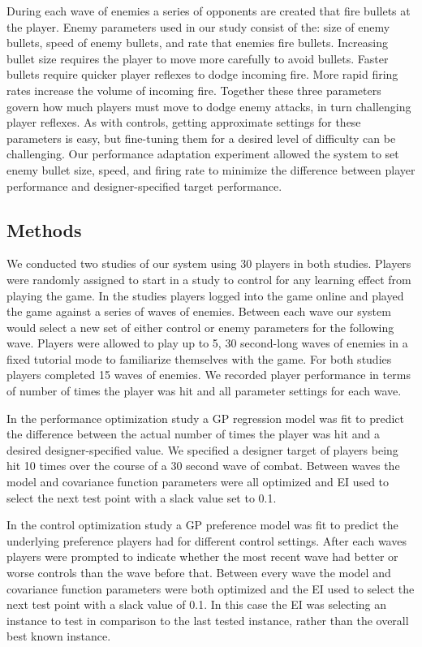 \documentclass[letterpaper]{article}
\begin{document}
During each wave of enemies a series of opponents are created that fire bullets at the player. Enemy parameters used in our study consist of the: size of enemy bullets, speed of enemy bullets, and rate that enemies fire bullets. Increasing bullet size requires the player to move more carefully to avoid bullets. Faster bullets require quicker player reflexes to dodge incoming fire. More rapid firing rates increase the volume of incoming fire. Together these three parameters govern how much players must move to dodge enemy attacks, in turn challenging player reflexes. As with controls, getting approximate settings for these parameters is easy, but fine-tuning them for a desired level of difficulty can be challenging. Our performance adaptation experiment allowed the system to set enemy bullet size, speed, and firing rate to minimize the difference between player performance and designer-specified target performance.


\subsection{Methods}
We conducted two studies of our system using 30 players in both studies. Players were randomly assigned to start in a study to control for any learning effect from playing the game. In the studies players logged into the game online and played the game against a series of waves of enemies. Between each wave our system would select a new set of either control or enemy parameters for the following wave. Players were allowed to play up to 5, 30 second-long waves of enemies in a fixed tutorial mode to familiarize themselves with the game. For both studies players completed 15 waves of enemies. We recorded player performance in terms of number of times the player was hit and all parameter settings for each wave.

In the performance optimization study a GP regression model was fit to predict the difference between the actual number of times the player was hit and a desired designer-specified value. We specified a designer target of players being hit 10 times over the course of a 30 second wave of combat. Between waves the model and covariance function parameters were all optimized and EI used to select the next test point with a slack value set to 0.1.

In the control optimization study a GP preference model was fit to predict the underlying preference players had for different control settings. After each waves players were prompted to indicate whether the most recent wave had better or worse controls than the wave before that. Between every wave the model and covariance function parameters were both optimized and the EI used to select the next test point with a slack value of 0.1. In this case the EI was selecting an instance to test in comparison to the last tested instance, rather than the overall best known instance.
\end{document}
